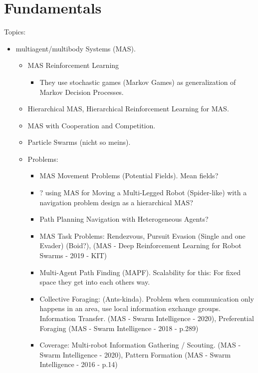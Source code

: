 
\chapter{Fundamentals}

Topics:
\begin{itemize}[noitemsep,nolistsep]
	\item multiagent/multibody Systems (MAS).
	\begin{itemize}[noitemsep,nolistsep]
		\item MAS Reinforcement Learning
		\begin{itemize}[noitemsep,nolistsep]
			\item They use stochastic games (Markov Games) as generalization of Markov Decision Processes.
		\end{itemize}
		\item Hierarchical MAS, Hierarchical Reinforcement Learning for MAS.
		\item MAS with Cooperation and Competition.
		\item Particle Swarms (nicht so meins).
		\item Problems:
		\begin{itemize}[noitemsep,nolistsep]
			\item MAS Movement Problems (Potential Fields). Mean fields?
			\item ? using MAS for Moving a Multi-Legged Robot (Spider-like) with a navigation problem design as a hierarchical MAS?
			\item Path Planning Navigation with Heterogeneous Agents? 
			\item MAS Task Problems: Rendezvous, Pursuit Evasion (Single and one Evader) (Boid?), (MAS - Deep Reinforcement Learning for Robot Swarms - 2019 - KIT)
			\item Multi-Agent Path Finding (MAPF). Scalability for this: For fixed space they get into each others way.
			\item Collective Foraging: (Ants-kinda). Problem when communication only happens in an area, use local information exchange groups. Information Transfer. (MAS - Swarm Intelligence - 2020), Preferential Foraging (MAS - Swarm Intelligence - 2018 - p.289)
			\item Coverage: Multi-robot Information Gathering / Scouting. (MAS - Swarm Intelligence - 2020), Pattern Formation (MAS - Swarm Intelligence - 2016 - p.14)

\end{itemize}
\end{itemize}
\end{itemize}
